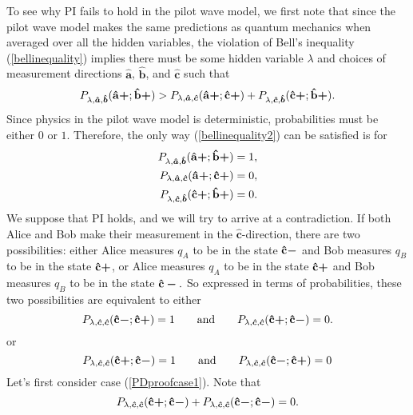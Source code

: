 To see why PI fails to hold in the pilot wave model, we first note that since the pilot wave model makes the same predictions as quantum mechanics when averaged over all the hidden variables, the violation of Bell's inequality (\ref{bellinequality}) implies there must be some hidden variable $\lambda$ and choices of measurement directions $\bm{\hat{a}}$, $\bm{\hat{b}}$, and $\bm{\hat{c}}$ such that 
 \begin{equation}\label{bellinequality2}
P_{\lambda,\bm{\hat{a}},\bm{\hat{b}}}(\vb{\hat{{a}}}\bm{+};\vb{\hat{{b}}}\bm{+})> P_{\lambda,\bm{\hat{a}},\bm{\hat{c}}}(\vb{\hat{{a}}}\bm{+};\vb{\hat{{c}}}\bm{+})+P_{\lambda,\bm{\hat{c}},\bm{\hat{b}}}(\vb{\hat{{c}}}\bm{+};\vb{\hat{{b}}}\bm{+}).
\end{equation}
Since physics in the pilot wave model is deterministic, probabilities must be either $0$ or $1$. Therefore, the only way (\ref{bellinequality2}) can be satisfied is for
 \begin{align}
P_{\lambda,\bm{\hat{a}},\bm{\hat{b}}}(\vb{\hat{{a}}}\bm{+};\vb{\hat{{b}}}\bm{+})&=1, \label{PDproof1}\\
P_{\lambda,\bm{\hat{a}},\bm{\hat{c}}}(\vb{\hat{{a}}}\bm{+};\vb{\hat{{c}}}\bm{+})&=0,\label{PDproof2}\\
P_{\lambda,\bm{\hat{c}},\bm{\hat{b}}}(\vb{\hat{{c}}}\bm{+};\vb{\hat{{b}}}\bm{+})&=0. \label{PDproof3}
 \end{align}
 We suppose that PI holds, and we will try to arrive at a contradiction. If both Alice and Bob make their measurement in the $\bm{\hat{c}}$-direction, there are two possibilities: either Alice measures $q_A$ to be in the state $\vb{\hat{{c}}}\bm{-}$ and Bob measures $q_B$ to be in the state $\vb{\hat{{c}}}\bm{+}$, or Alice measures $q_A$ to be in the state $\vb{\hat{{c}}}\bm{+}$ and Bob measures $q_B$ to be in the state $\vb{\hat{{c}}}\bm{-}.$ So expressed in terms of probabilities, these two possibilities are equivalent to either 
 \begin{equation}\label{PDproofcase1}
 P_{\lambda,\bm{\hat{c}},\bm{\hat{c}}}(\vb{\hat{{c}}}\bm{-};\vb{\hat{{c}}}\bm{+})=1 \qquad\text{and}\qquad  P_{\lambda,\bm{\hat{c}},\bm{\hat{c}}}(\vb{\hat{{c}}}\bm{+};\vb{\hat{{c}}}\bm{-})=0.
 \end{equation}
 or 
  \begin{equation}\label{PDproofcase2}
 P_{\lambda,\bm{\hat{c}},\bm{\hat{c}}}(\vb{\hat{{c}}}\bm{+};\vb{\hat{{c}}}\bm{-})=1 \qquad\text{and}\qquad P_{\lambda,\bm{\hat{c}},\bm{\hat{c}}}(\vb{\hat{{c}}}\bm{-};\vb{\hat{{c}}}\bm{+})=0
 \end{equation}
 Let's first consider case (\ref{PDproofcase1}). Note that
\begin{equation}
 P_{\lambda,\bm{\hat{c}},\bm{\hat{c}}}(\vb{\hat{{c}}}\bm{+};\vb{\hat{{c}}}\bm{-})+P_{\lambda,\bm{\hat{c}},\bm{\hat{c}}}(\vb{\hat{{c}}}\bm{-};\vb{\hat{{c}}}\bm{-})=0.
\end{equation}
